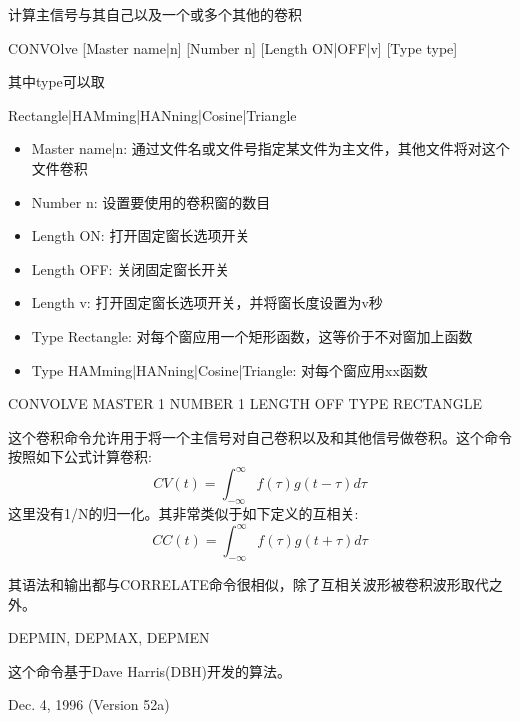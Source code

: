 \label{cmd:convolve}

计算主信号与其自己以及一个或多个其他的卷积

CONVOlve [Master name|n] [Number n] [Length ON|OFF|v] [Type type]

其中type可以取

Rectangle|HAMming|HANning|Cosine|Triangle

\begin{itemize}
\item Master name|n: 通过文件名或文件号指定某文件为主文件，其他文件将对这个文件卷积
\item Number n: 设置要使用的卷积窗的数目
\item Length ON: 打开固定窗长选项开关
\item Length OFF: 关闭固定窗长开关
\item Length v: 打开固定窗长选项开关，并将窗长度设置为v秒
\item Type Rectangle: 对每个窗应用一个矩形函数，这等价于不对窗加上函数
\item Type HAMming|HANning|Cosine|Triangle: 对每个窗应用xx函数
\end{itemize}

CONVOLVE MASTER 1 NUMBER 1 LENGTH OFF TYPE RECTANGLE

这个卷积命令允许用于将一个主信号对自己卷积以及和其他信号做卷积。这个命令按照如下公式计算卷积:
	\[ CV(t) = \int_{-\infty} ^\infty f(\tau)g(t-\tau)d\tau \]
这里没有1/N的归一化。其非常类似于如下定义的互相关:
	\[ CC(t) = \int_{-\infty} ^\infty f(\tau)g(t+\tau)d\tau \]
	
其语法和输出都与CORRELATE命令很相似，除了互相关波形被卷积波形取代之外。

DEPMIN, DEPMAX, DEPMEN

这个命令基于Dave Harris(DBH)开发的算法。

Dec. 4, 1996 (Version 52a)
